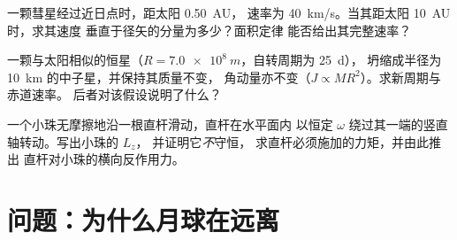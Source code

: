 \begin{exercise}[$\star\star\star$]\label{exo:b1:angular-momentum:10}
一颗彗星经过近日点时，距太阳 \qty{0.50}{AU}，
速率为 \qty{40}{km/s}。当其距太阳 \qty{10}{AU} 时，求其速度
垂直于径矢的分量为多少？面积定律
能否给出其完整速率？
\end{exercise}

\begin{exercise}[$\star\star\star$]\label{exo:b1:angular-momentum:11}
一颗与太阳相似的恒星（$R = \qty{7.0e8}{m}$，自转周期为 \qty{25}{d}），
坍缩成半径为 \qty{10}{km} 的中子星，并保持其质量不变，
角动量亦不变（$J \propto MR^2$）。求新周期与赤道速率。
后者对该假设说明了什么？
\end{exercise}

\begin{exercise}[$\star\star\star$]\label{exo:b1:angular-momentum:12}
一个小珠无摩擦地沿一根直杆滑动，直杆在水平面内
以恒定 $\omega$ 绕过其一端的竖直轴转动。写出小珠的 $L_z$，
并证明它\emph{不}守恒，
求直杆必须施加的力矩，并由此推出
直杆对小珠的横向反作用力。
\end{exercise}

\section{问题：为什么月球在远离}

